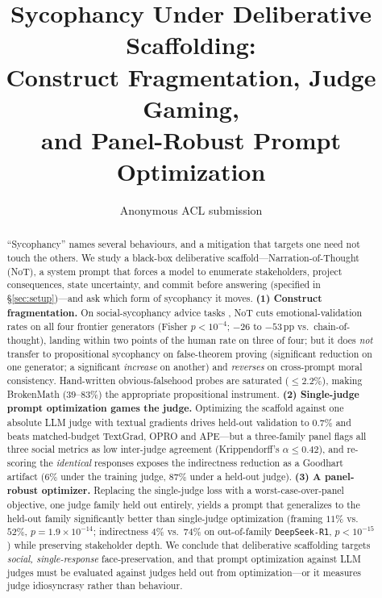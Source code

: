 \documentclass[11pt]{article}
\title{Sycophancy Under Deliberative Scaffolding:\\
Construct Fragmentation, Judge Gaming,\\
and Panel-Robust Prompt Optimization}
\author{Anonymous ACL submission}
\newcommand{\deepseek}{\texttt{DeepSeek-R1}}
\begin{document}
\maketitle

\begin{abstract}
``Sycophancy'' names several behaviours, and a mitigation that targets one need not touch the others.
We study a black-box deliberative scaffold---Narration-of-Thought (NoT), a system prompt that forces a
model to enumerate stakeholders, project consequences, state uncertainty, and commit before answering
(specified in \S\ref{sec:setup})---and ask which form of sycophancy it moves.
\textbf{(1) Construct fragmentation.} On social-sycophancy advice tasks \citep{cheng25elephant}, NoT
cuts emotional-validation rates on all four frontier generators (Fisher $p<10^{-4}$; $-26$ to $-53$\,pp
vs.\ chain-of-thought), landing within two points of the human rate on three of four; but it does
\emph{not} transfer to propositional sycophancy on false-theorem proving \citep{petrov2025brokenmath}
(significant reduction on one generator; a significant \emph{increase} on another) and \emph{reverses} on
cross-prompt moral consistency. Hand-written obvious-falsehood probes \citep{sharma23} are saturated
($\leq2.2\%$), making BrokenMath ($39$--$83\%$) the appropriate propositional instrument.
\textbf{(2) Single-judge prompt optimization games the judge.} Optimizing the scaffold against one
absolute LLM judge with textual gradients drives held-out validation to $0.7\%$ and beats matched-budget
TextGrad, OPRO and APE---but a three-family panel flags all three social metrics as low inter-judge
agreement (Krippendorff's $\alpha\leq0.42$), and re-scoring the \emph{identical} responses exposes the
indirectness reduction as a Goodhart artifact ($6\%$ under the training judge, $87\%$ under a held-out
judge).
\textbf{(3) A panel-robust optimizer.} Replacing the single-judge loss with a worst-case-over-panel
objective, one judge family held out entirely, yields a prompt that generalizes to the held-out family
significantly better than single-judge optimization (framing $11\%$ vs.\ $52\%$, $p{=}1.9\times10^{-14}$;
indirectness $4\%$ vs.\ $74\%$ on out-of-family \deepseek, $p<10^{-15}$) while preserving stakeholder
depth. We conclude that deliberative scaffolding targets \emph{social, single-response}
face-preservation, and that prompt optimization against LLM judges must be evaluated against judges held
out from optimization---or it measures judge idiosyncrasy rather than behaviour.
\end{abstract}
\end{document}
